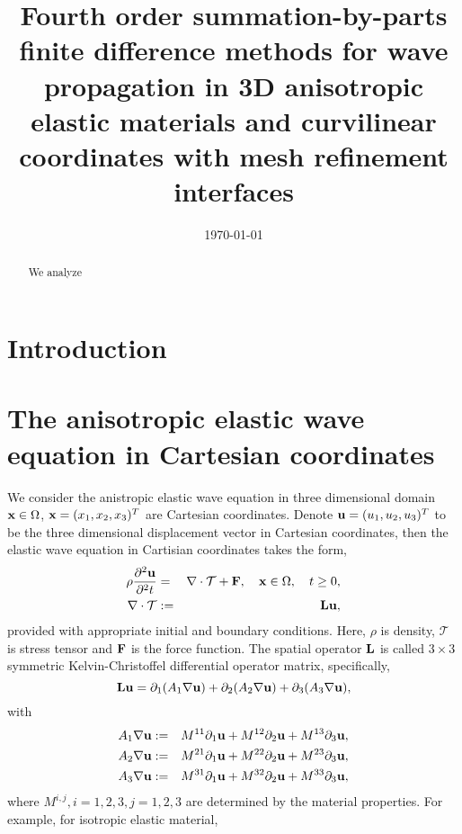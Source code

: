 \documentclass[a4paper]{article}
\title{Fourth order summation-by-parts finite difference methods for wave propagation in 3D anisotropic elastic materials and curvilinear coordinates with mesh refinement interfaces}
\date{\today}
\begin{document}
\maketitle

\begin{abstract}
We analyze
\end{abstract}

\section{Introduction}

\section{The anisotropic elastic wave equation in Cartesian coordinates}
We consider the anistropic elastic wave equation in three dimensional domain ${\bf x} \in \Omega$, ${\bf x} = (x_1,x_2,x_3)^T$ are Cartesian coordinates. Denote ${\bf u} = (u_1,u_2,u_3)^T$ to be the three dimensional displacement vector in Cartesian coordinates, then the elastic wave equation in Cartisian coordinates takes the form,
\begin{eqnarray*}
    \rho\frac{\partial^2{\bf u}}{\partial^2 t} &=& \nabla\cdot\mathcal{T} + {\bf F}, \ \ \ {\bf x}\in\Omega,\ \ \ t\geq 0,\\
    \nabla\cdot\mathcal{T} &:=& {\bf Lu},
\end{eqnarray*}
provided with appropriate initial and boundary conditions. Here, $\rho$ is density, $\mathcal{T}$ is stress tensor and ${\bf F}$ is the force function. The spatial operator ${\bf L}$ is called $3\times3$ symmetric Kelvin-Christoffel differential operator matrix, specifically,
\begin{equation*}
    {\bf L u} = \partial_1(A_1\nabla{\bf u}) + \partial_2(A_2\nabla{\bf u}) + \partial_3(A_3\nabla{\bf u}),
\end{equation*}
with
\begin{eqnarray*}
A_1\nabla{\bf u} &:=& M^{11}\partial_1{\bf u} + M^{12}\partial_2{\bf u} + M^{13}\partial_3{\bf u}, \\
A_2\nabla{\bf u} &:=& M^{21}\partial_1{\bf u} + M^{22}\partial_2{\bf u} + M^{23}\partial_3{\bf u}, \\
A_3\nabla{\bf u} &:=& M^{31}\partial_1{\bf u} + M^{32}\partial_2{\bf u} + M^{33}\partial_3{\bf u},
\end{eqnarray*}
where $M^{i,j}, i = 1,2,3, j = 1,2,3$ are determined by the material properties. For example, for isotropic elastic material,
\end{document}
